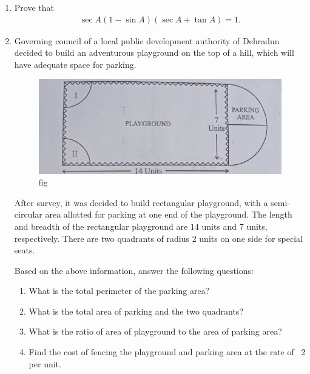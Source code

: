 \documentclass{article}
\providecommand{\brak}[1]{\ensuremath{\left(#1\right)}}
\begin{document}
\begin{enumerate}
    \item Prove that 
    \begin{align}
        \sec A\brak{1-\sin A}\brak{\sec A+\tan A}=1.
    \end{align}

    \item Governing council of a local public development authority of Dehradun decided to build an adventurous playground on the top of a hill, which will have adequate space for parking.
    
    \begin{figure}[H]
    \centering
    \includegraphics[width=\columnwidth]{figs/fig.png}
    \caption{fig}
    \label{fig:enter-label}
\end{figure}
After survey, it was decided to build rectangular playground, with a semi-circular area allotted for parking at one end of the playground. The length and breadth of the rectangular playground are $14$ units and $7$ units, respectively. There are two quadrants of radius $2$ units on one side for special seats.

Based on the above information, answer the following questions:
\begin{enumerate}
    \item What is the total perimeter of the parking area?
    \item What is the total area of parking and the two quadrants?
    \item What is the ratio of area of playground to the area of parking area?
    \item Find the cost of fencing the playground and parking area at the rate of \rupee~2 per unit.
\end{enumerate}

    
    \end{enumerate}
    
\end{document}
